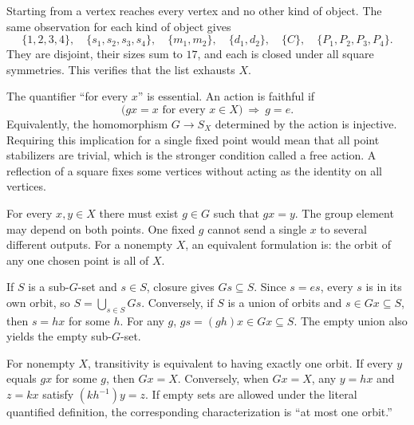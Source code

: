 Starting from a vertex reaches every vertex and no other kind of object.
The same observation for each kind of object gives
\[
\{1,2,3,4\},\quad\{s_1,s_2,s_3,s_4\},\quad
\{m_1,m_2\},\quad\{d_1,d_2\},\quad\{C\},\quad
\{P_1,P_2,P_3,P_4\}.
\]
They are disjoint, their sizes sum to $17$, and each is closed under all
square symmetries. This verifies that the list exhausts $X$.

The quantifier ``for every $x$'' is essential. An action is faithful if
\[
\bigl(gx=x\text{ for every }x\in X\bigr)\ \Longrightarrow\ g=e.
\]
Equivalently, the homomorphism $G\to S_X$ determined by the action is injective.
Requiring this implication for a single fixed point would mean that all
point stabilizers are trivial, which is the stronger condition called a
free action. A reflection of a square fixes some vertices without acting
as the identity on all vertices.

For every $x,y\in X$ there must exist $g\in G$ such that $gx=y$. The group
element may depend on both points. One fixed $g$ cannot send a single $x$
to several different outputs. For a nonempty $X$, an equivalent formulation
is: the orbit of any one chosen point is all of $X$.

If $S$ is a sub-$G$-set and $s\in S$, closure gives $Gs\subseteq S$.
Since $s=es$, every $s$ is in its own orbit, so $S=\bigcup_{s\in S}Gs$.
Conversely, if $S$ is a union of orbits and $s\in Gx\subseteq S$, then
$s=hx$ for some $h$. For any $g$, $gs=(gh)x\in Gx\subseteq S$.
The empty union also yields the empty sub-$G$-set.

For nonempty $X$, transitivity is equivalent to having exactly one orbit.
If every $y$ equals $gx$ for some $g$, then $Gx=X$. Conversely, when
$Gx=X$, any $y=hx$ and $z=kx$ satisfy $(kh^{-1})y=z$.
If empty sets are allowed under the literal quantified definition, the
corresponding characterization is ``at most one orbit.''

